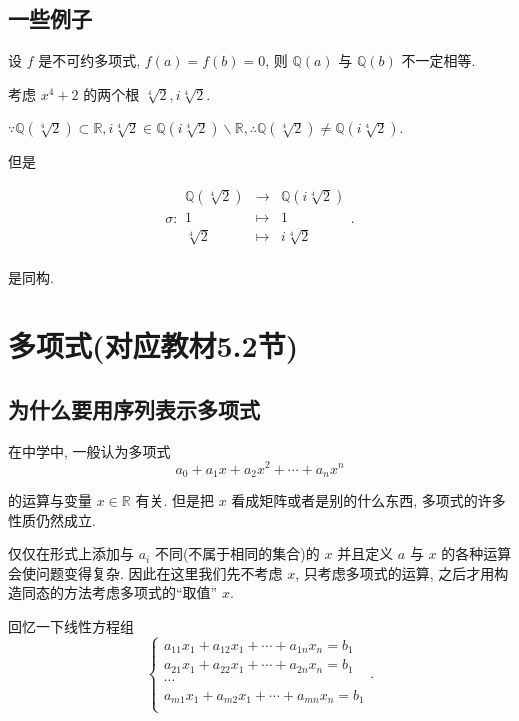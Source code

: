 \documentclass[color=black,device=normal,lang=cn,mode=geye]{elegantnote}
\begin{document}
\subsection{一些例子}
\begin{example}
    设 $f$ 是不可约多项式, $f(a)=f(b)=0$, 则 $\mathbb{Q}(a)$ 与 $\mathbb{Q}(b)$ 不一定相等.

    考虑 $x^4+2$ 的两个根 $\sqrt[4]{2},i\sqrt[4]{2}$.

    $\because\mathbb{Q}(\sqrt[4]{2})\subset\mathbb{R},i\sqrt[4]{2}\in\mathbb{Q}(i\sqrt[4]{2})\backslash\mathbb{R},\therefore\mathbb{Q}(\sqrt[4]{2})\neq\mathbb{Q}(i\sqrt[4]{2})$.

    但是

    \[\sigma:\begin{array}{rcl}
        \mathbb{Q}(\sqrt[4]{2}) & \to & \mathbb{Q}(i\sqrt[4]{2}) \\
        1 & \mapsto & 1 \\
        \sqrt[4]{2} & \mapsto & i\sqrt[4]{2} \\
    \end{array}.\]

    是同构.
\end{example}
\section{多项式(对应教材5.2节)}
\subsection{为什么要用序列表示多项式}
在中学中, 一般认为多项式
\begin{equation}\label{eq2.1}
    a_0+a_1x+a_2x^2+\cdots+a_nx^n
\end{equation}

的运算与变量 $x\in\mathbb{R}$ 有关. 但是把 $x$ 看成矩阵或者是别的什么东西, 多项式的许多性质仍然成立.

仅仅在形式上添加与 $a_i$ 不同(不属于相同的集合)的 $x$ 并且定义 $a$ 与 $x$ 的各种运算会使问题变得复杂. 因此在这里我们先不考虑 $x$, 只考虑多项式的运算, 之后才用构造同态的方法考虑多项式的``取值'' $x$.

回忆一下线性方程组
\[\begin{cases}
    a_{11}x_1+a_{12}x_1+\cdots+a_{1n}x_n=b_1 \\
    a_{21}x_1+a_{22}x_1+\cdots+a_{2n}x_n=b_1 \\
    \cdots \\
    a_{m1}x_1+a_{m2}x_1+\cdots+a_{mn}x_n=b_1 \\
\end{cases}.\]
\end{document}
